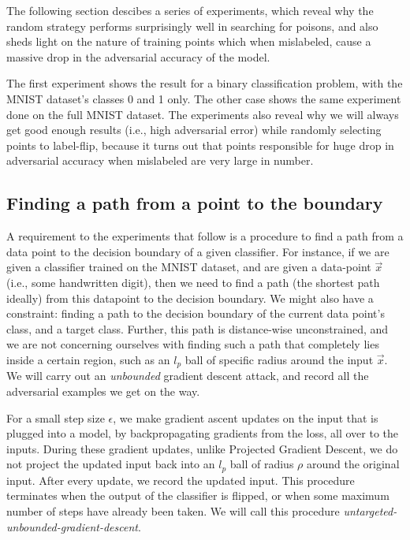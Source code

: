 \documentclass{ociamthesis}
\begin{document}
The following section descibes a series of experiments, which reveal why the
random strategy performs surprisingly well in searching for poisons, and also
sheds light on the nature of training points which when mislabeled, cause a
massive drop in the adversarial accuracy of the model.

The first experiment shows the result for a binary classification problem, with
the MNIST dataset's classes 0 and 1 only. The other case shows the same
experiment done on the full MNIST dataset. The experiments also reveal why we
will always get good enough results (i.e., high adversarial error) while
randomly selecting points to label-flip, because it turns out that points
responsible for huge drop in adversarial accuracy when mislabeled are very large
in number.

\subsection{Finding a path from a point to the boundary}

A requirement to the experiments that follow is a procedure to find a path from
a data point to the decision boundary of a given classifier. For instance, if we
are given a classifier trained on the MNIST dataset, and are given a data-point
$\vec{x}$ (i.e., some handwritten digit), then we need to find a path (the
shortest path ideally) from this datapoint to the decision boundary. We might
also have a constraint: finding a path to the decision boundary of the current
data point's class, and a target class. Further, this path is distance-wise
unconstrained, and we are not concerning ourselves with finding such a path that
completely lies inside a certain region, such as an $l_p$ ball of specific
radius around the input $\vec{x}$. We will carry out an \emph{unbounded}
gradient descent attack, and record all the adversarial examples we get on the
way.

For a small step size $\epsilon$, we make gradient ascent updates on the input
that is plugged into a model, by backpropagating gradients from the loss, all
over to the inputs. During these gradient updates, unlike Projected Gradient
Descent, we do not project the updated input back into an $l_p$ ball of radius
$\rho$ around the original input. After every update, we record the updated
input. This procedure terminates when the output of the classifier is flipped,
or when some maximum number of steps have already been taken. We will call this
procedure \emph{untargeted-unbounded-gradient-descent}.
\end{document}
